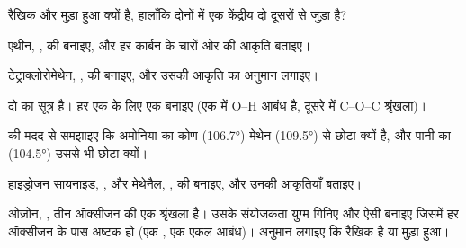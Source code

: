 \begin{exercise}[$\star\star$]\label{exo:g10:lewis-and-shape:9}
 रैखिक और  मुड़ा हुआ क्यों है, हालाँकि दोनों में एक केंद्रीय 
दो दूसरों से जुड़ा है?
\end{exercise}

\begin{exercise}[$\star\star$]\label{exo:g10:lewis-and-shape:10}
एथीन, , की  बनाइए, और हर कार्बन  के चारों ओर की
आकृति बताइए।
\end{exercise}

\begin{exercise}[$\star\star$]\label{exo:g10:lewis-and-shape:11}
टेट्राक्लोरोमेथेन, , की  बनाइए, और उसकी आकृति का
अनुमान लगाइए।
\end{exercise}

\begin{exercise}[$\star\star\star$]\label{exo:g10:lewis-and-shape:12}
दो  का सूत्र  है। हर एक के लिए एक  बनाइए
(एक में O--H आबंध है, दूसरे में C--O--C श्रृंखला)।
\end{exercise}

\begin{exercise}[$\star\star\star$]\label{exo:g10:lewis-and-shape:13}
 की मदद से समझाइए कि अमोनिया का कोण (\ang{106.7}) मेथेन
(\ang{109.5}) से छोटा क्यों है, और पानी का (\ang{104.5}) उससे भी
छोटा क्यों।
\end{exercise}

\begin{exercise}[$\star\star\star$]\label{exo:g10:lewis-and-shape:14}
हाइड्रोजन सायनाइड, , और मेथेनैल,
, की  बनाइए, और उनकी आकृतियाँ बताइए।
\end{exercise}

\begin{exercise}[$\star\star\star$]\label{exo:g10:lewis-and-shape:15}
ओज़ोन, , तीन ऑक्सीजन  की एक श्रृंखला है। उसके संयोजकता युग्म गिनिए
और ऐसी  बनाइए जिसमें हर ऑक्सीजन के पास अष्टक हो (एक
, एक एकल आबंध)। अनुमान लगाइए कि  रैखिक है या
मुड़ा हुआ।
\end{exercise}

